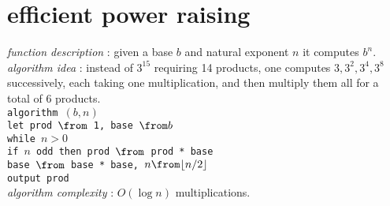 \section*{efficient power raising}
\textit{function description} : given a base $b$ and natural exponent $n$ it computes $b^n$.\\
\textit{algorithm idea} : instead of $3^{15}$ requiring 14 products, one computes $3,3^2,3^4,3^8$ successively, each taking one multiplication, and then multiply them all for a total of 6 products.\\
\texttt{algorithm $(b,n)$\\
\tab let prod $\from$ 1, base $\from b$\\
\tab while $n>0$\\
\tab\tab if $n$ odd then prod $\from$ prod * base\\
\tab\tab base $\from$ base * base, $n \from \lfloor n/2\rfloor$\\
\tab output prod}\\
\textit{algorithm complexity} : $O(\log n)$ multiplications.\\
